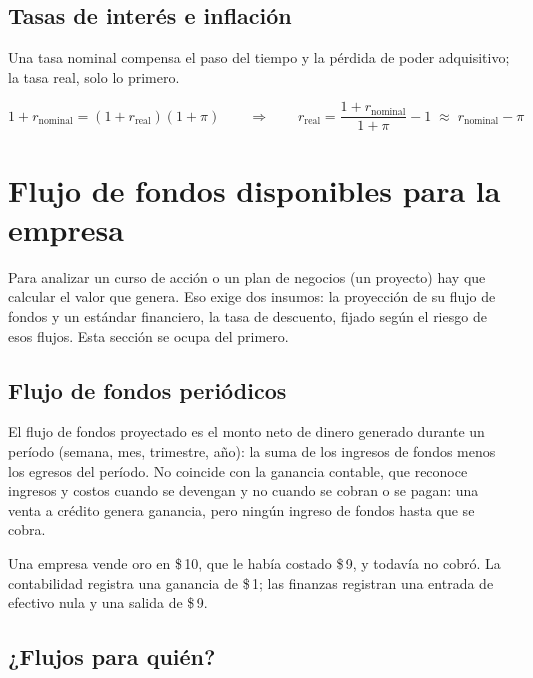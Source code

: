 \subsection{Tasas de interés e inflación}

Una tasa nominal compensa el paso del tiempo y la pérdida de poder adquisitivo; la tasa real, solo lo primero.

\begin{formulaBox}
\[
1+r_{\text{nominal}} = (1+r_{\text{real}})(1+\pi)
\qquad\Longrightarrow\qquad
r_{\text{real}} = \frac{1+r_{\text{nominal}}}{1+\pi}-1 \;\approx\; r_{\text{nominal}}-\pi
\]
\end{formulaBox}

\section{Flujo de fondos disponibles para la empresa}\label{sec:u1-fcff}

Para analizar un curso de acción o un plan de negocios (un proyecto) hay que calcular el valor que genera. Eso exige dos insumos: la proyección de su flujo de fondos y un estándar financiero, la tasa de descuento, fijado según el riesgo de esos flujos. Esta sección se ocupa del primero.

\subsection{Flujo de fondos periódicos}

El flujo de fondos proyectado es el monto neto de dinero generado durante un período (semana, mes, trimestre, año): la suma de los ingresos de fondos menos los egresos del período. No coincide con la ganancia contable, que reconoce ingresos y costos cuando se devengan y no cuando se cobran o se pagan: una venta a crédito genera ganancia, pero ningún ingreso de fondos hasta que se cobra.

\begin{ejemplo}
Una empresa vende oro en \$\,10, que le había costado \$\,9, y todavía no cobró. La contabilidad registra una ganancia de \$\,1; las finanzas registran una entrada de efectivo nula y una salida de \$\,9.
\end{ejemplo}

\subsection{¿Flujos para quién?}

